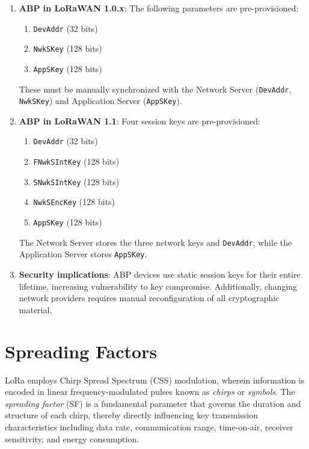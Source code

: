\begin{enumerate}
    \item \textbf{ABP in LoRaWAN 1.0.x}: The following parameters are pre-provisioned:
          \begin{enumerate}
              \item \texttt{DevAddr} (32 bits)
              \item \texttt{NwkSKey} (128 bits)
              \item \texttt{AppSKey} (128 bits)
          \end{enumerate}
          These must be manually synchronized with the Network Server (\texttt{DevAddr}, \texttt{NwkSKey}) and Application Server (\texttt{AppSKey}).

    \item \textbf{ABP in LoRaWAN 1.1}: Four session keys are pre-provisioned:
          \begin{enumerate}
              \item \texttt{DevAddr} (32 bits)
              \item \texttt{FNwkSIntKey} (128 bits)
              \item \texttt{SNwkSIntKey} (128 bits)
              \item \texttt{NwkSEncKey} (128 bits)
              \item \texttt{AppSKey} (128 bits)
          \end{enumerate}
          The Network Server stores the three network keys and \texttt{DevAddr}, while the Application Server stores \texttt{AppSKey}.

    \item \textbf{Security implications}: ABP devices use static session keys for their entire lifetime, increasing vulnerability to key compromise. Additionally, changing network providers requires manual reconfiguration of all cryptographic material.
\end{enumerate}



\section{Spreading Factors}

LoRa employs Chirp Spread Spectrum (CSS) modulation, wherein information is encoded in linear frequency-modulated pulses known as \emph{chirps} or \emph{symbols}. The \emph{spreading factor} (SF) is a fundamental parameter that governs the duration and structure of each chirp, thereby directly influencing key transmission characteristics including data rate, communication range, time-on-air, receiver sensitivity, and energy consumption.

